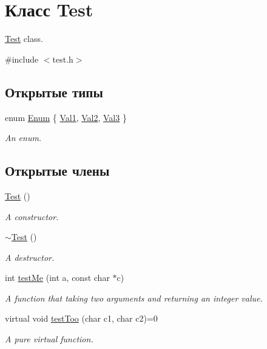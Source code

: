 \hypertarget{class_test}{}\section{Класс Test}
\label{class_test}


\hyperlink{class_test}{Test} class.  




{\ttfamily \#include $<$test.\+h$>$}

\subsection*{Открытые типы}
\begin{DoxyCompactItemize}
\item 
enum \hyperlink{class_test_add48b50526c27bcdb96b828ddfaaf648}{Enum} \{ \hyperlink{class_test_add48b50526c27bcdb96b828ddfaaf648ac16e029a3b8c91d99a0686976a462c04}{Val1}, 
\hyperlink{class_test_add48b50526c27bcdb96b828ddfaaf648a9b788b4425e6d31a873a328dcd790229}{Val2}, 
\hyperlink{class_test_add48b50526c27bcdb96b828ddfaaf648a17d096ff67b82d5bcb7b4133467e49f7}{Val3}
 \}\begin{DoxyCompactList}\small\item\em An enum. \end{DoxyCompactList}
\end{DoxyCompactItemize}
\subsection*{Открытые члены}
\begin{DoxyCompactItemize}
\item 
\hyperlink{class_test_a99f2bbfac6c95612322b0f10e607ebe5}{Test} ()
\begin{DoxyCompactList}\small\item\em A constructor. \end{DoxyCompactList}\item 
\hyperlink{class_test_a2b0a62f1e667bbe8d8cb18d785bfa991}{$\sim$\+Test} ()
\begin{DoxyCompactList}\small\item\em A destructor. \end{DoxyCompactList}\item 
int \hyperlink{class_test_ae41a1e1bd9116e7b8f166500f6d6a38b}{test\+Me} (int a, const char $\ast$c)
\begin{DoxyCompactList}\small\item\em A function that taking two arguments and returning an integer value. \end{DoxyCompactList}\item 
virtual void \hyperlink{class_test_aebeca5098345184f423cecb03d8cb615}{test\+Too} (char c1, char c2)=0
\begin{DoxyCompactList}\small\item\em A pure virtual function. \end{DoxyCompactList}\end{DoxyCompactItemize}
